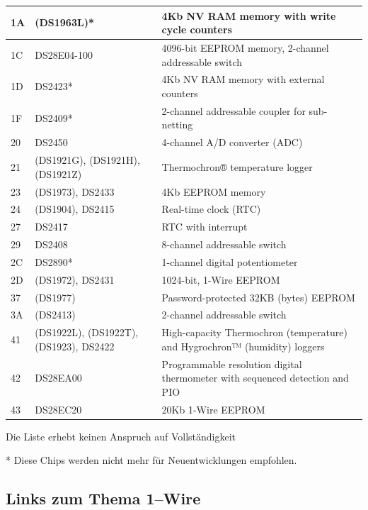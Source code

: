 \begin{center}
\begin{tabular}{|p{}|p{}|p{}|}
1A & (DS1963L)*                           & 4Kb NV RAM memory with write cycle counters \\ \hline
1C & DS28E04-100                          & 4096-bit EEPROM memory, 2-channel addressable switch \\ \hline
1D & DS2423*                              & 4Kb NV RAM memory with external counters \\ \hline
1F & DS2409*                              & 2-channel addressable coupler for sub-netting \\ \hline
20 & DS2450                               & 4-channel A/D converter (ADC) \\ \hline
21 & (DS1921G), (DS1921H), (DS1921Z)      & Thermochron® temperature logger \\ \hline
23 & (DS1973), DS2433                     & 4Kb EEPROM memory \\ \hline
24 & (DS1904), DS2415                     & Real-time clock (RTC) \\ \hline
27 & DS2417                               & RTC with interrupt \\ \hline
29 & DS2408                               & 8-channel addressable switch \\ \hline
2C & DS2890*                              & 1-channel digital potentiometer \\ \hline
2D & (DS1972), DS2431                     & 1024-bit, 1-Wire EEPROM \\ \hline
37 & (DS1977)                             & Password-protected 32KB (bytes) EEPROM \\ \hline
3A & (DS2413)                             & 2-channel addressable switch \\ \hline
41 & (DS1922L), (DS1922T), (DS1923), DS2422 & \raggedright High-capacity Thermochron (temperature) and Hygrochron™ (humidity) loggers \tabularnewline \hline
42 & DS28EA00                             & \raggedright Programmable resolution digital thermometer with sequenced detection and PIO \tabularnewline \hline
43 & DS28EC20                             & 20Kb 1-Wire EEPROM \\ \hline
\end{tabular}
\end{center}

Die Liste erhebt keinen Anspruch auf Vollständigkeit

* Diese Chips werden nicht mehr für Neuentwicklungen empfohlen.


\subsection{Links zum Thema 1--Wire}

